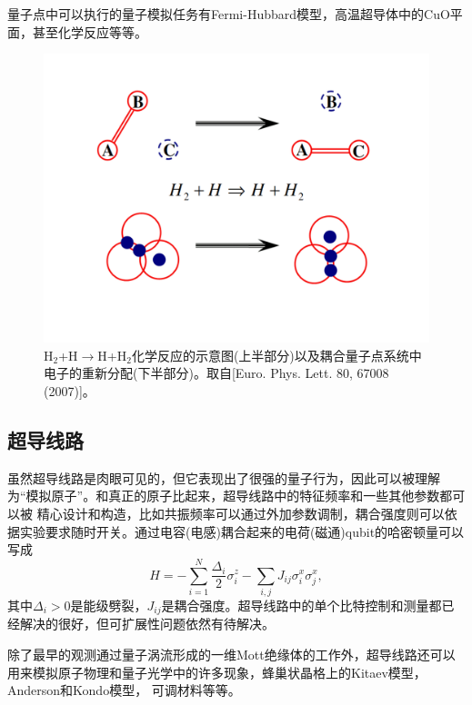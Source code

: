 量子点中可以执行的量子模拟任务有Fermi-Hubbard模型\cite{dotsim2}，高温超导体中的CuO平面\cite{dotsim3}，甚至化学反应\cite{reaction}等等。 \begin{figure}[htbp]
            \begin{center}
              \includegraphics[width= 0.8\columnwidth]{figures/dotsim.pdf}
              \caption{H$_2$+H$\longrightarrow$H+H$_2$化学反应的示意图(上半部分)以及耦合量子点系统中
              电子的重新分配(下半部分)。取自[Euro. Phys. Lett. 80, 67008 (2007)\cite{reaction}]。
              }
              \label{dotsim}
            \end{center}
        \end{figure}

\subsection{超导线路}

虽然超导线路是肉眼可见的，但它表现出了很强的量子行为，因此可以被理解为“模拟原子”。和真正的原子比起来，超导线路中的特征频率和一些其他参数都可以被
精心设计和构造，比如共振频率可以通过外加参数调制，耦合强度则可以依据实验要求随时开关。通过电容(电感)耦合起来的电荷(磁通)qubit的哈密顿量可以写成
 \begin{equation}\label{supersim}
 H = -\sum_{i=1}^N \frac{\Delta_i}{2} \sigma_i^z-\sum_{i,j}J_{ij} \sigma_i^x\sigma_j^x,
\end{equation}
其中$\Delta_i>0$是能级劈裂，$J_{ij}$是耦合强度。超导线路中的单个比特控制和测量都已经解决的很好，但可扩展性问题依然有待解决。

除了最早的观测通过量子涡流形成的一维Mott绝缘体\cite{supersim1}的工作外，超导线路还可以用来模拟原子物理和量子光学中\cite{supersim5}的许多现象，蜂巢状晶格上的Kitaev模型\cite{supersim2}，Anderson和Kondo模型\cite{supersim3}，
可调材料\cite{supersim4}等等。

